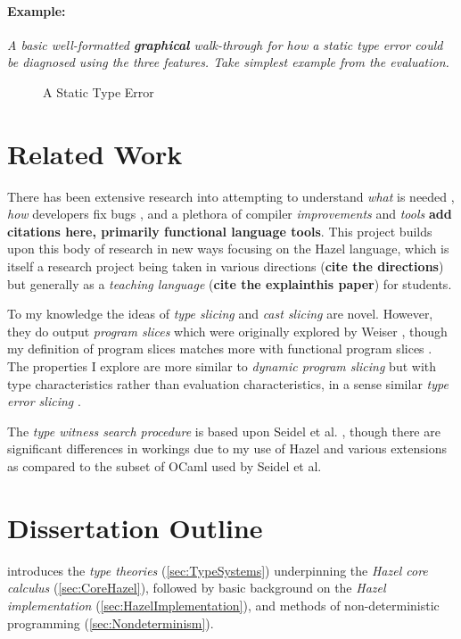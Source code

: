 \paragraph{Example:} \textit{A basic well-formatted \textbf{graphical} walk-through for how a static type error could be diagnosed using the three features. Take simplest example from the evaluation.}

\begin{figure}

\caption{A Static Type Error}
\label{fig:ErrorExample}
\end{figure}

\section{Related Work}
\label{sec:RelatedWork}
There has been extensive research into attempting to understand \textit{what} is needed \cite{DebugNeeds}, \textit{how} developers fix bugs \cite{HowFixBugs}, and a plethora of compiler \textit{improvements} and \textit{tools} \textbf{add citations here, primarily functional language tools}. This project builds upon this body of research in new ways focusing on the Hazel language, which is itself a research project being taken in various directions (\textbf{cite the directions}) but generally as a \textit{teaching language} (\textbf{cite the explainthis paper}) for students. 

To my knowledge the ideas of \textit{type slicing} and \textit{cast slicing} are novel. However, they do output \textit{program slices} which were originally explored by Weiser \cite{ProgSlice}, though my definition of program slices matches more with functional program slices \cite{FunctionalProgExplain}.  The properties I explore are more similar to \textit{dynamic program slicing} \cite{DynProgSlice} but with type characteristics rather than evaluation characteristics, in a sense similar \textit{type error slicing} \cite{ErrSlice}.

The \textit{type witness search procedure} is	 based upon Seidel et al. \cite{SearchProc}, though there are significant differences in workings due to my use of Hazel and various extensions as compared to the subset of OCaml used by Seidel et al.

\section{Dissertation Outline}
\label{sec:Outline}
 introduces the \textit{type theories} (\cref{sec:TypeSystems}) underpinning the \textit{Hazel core calculus} (\cref{sec:CoreHazel}), followed by basic background on the \textit{Hazel implementation} (\cref{sec:HazelImplementation}), and methods of non-deterministic programming (\cref{sec:Nondeterminism}).

